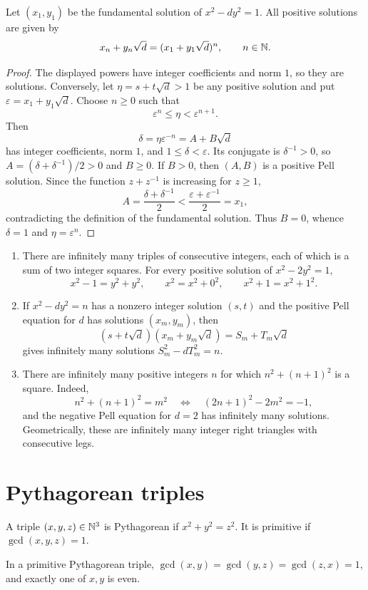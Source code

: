 \begin{thm}
Let $(x_1,y_1)$ be the fundamental solution of $x^2-dy^2=1$.  All positive solutions are given by
\[
 x_n+y_n\sqrt d=(x_1+y_1\sqrt d)^n,
 \qquad n\in\mathbb{N}.
\]
\end{thm}
\begin{proof}
The displayed powers have integer coefficients and norm $1$, so they are solutions.  Conversely, let
$\eta=s+t\sqrt d>1$ be any positive solution and put
$\varepsilon=x_1+y_1\sqrt d$.  Choose $n\ge0$ such that
\[
 \varepsilon^n\le\eta<\varepsilon^{n+1}.
\]
Then
\[
 \delta=\eta\varepsilon^{-n}=A+B\sqrt d
\]
has integer coefficients, norm $1$, and $1\le\delta<\varepsilon$.  Its conjugate is $\delta^{-1}>0$, so
$A=(\delta+\delta^{-1})/2>0$ and $B\ge0$.  If $B>0$, then $(A,B)$ is a positive Pell solution.  Since the function $z+z^{-1}$ is increasing for $z\ge1$,
\[
 A=\frac{\delta+\delta^{-1}}2
 <\frac{\varepsilon+\varepsilon^{-1}}2=x_1,
\]
contradicting the definition of the fundamental solution.  Thus $B=0$, whence $\delta=1$ and $\eta=\varepsilon^n$.
\end{proof}

\begin{app}
\begin{enumerate}[label=(\alph*)]
\item There are infinitely many triples of consecutive integers, each of which is a sum of two integer squares.  For every positive solution of $x^2-2y^2=1$,
\[
 x^2-1=y^2+y^2,
 \qquad
 x^2=x^2+0^2,
 \qquad
 x^2+1=x^2+1^2.
\]
\item If $x^2-dy^2=n$ has a nonzero integer solution $(s,t)$ and the positive Pell equation for $d$ has solutions $(x_m,y_m)$, then
\[
 (s+t\sqrt d)(x_m+y_m\sqrt d)=S_m+T_m\sqrt d
\]
gives infinitely many solutions $S_m^2-dT_m^2=n$.
\item There are infinitely many positive integers $n$ for which $n^2+(n+1)^2$ is a square.  Indeed,
\[
 n^2+(n+1)^2=m^2
 \quad\Longleftrightarrow\quad
 (2n+1)^2-2m^2=-1,
\]
and the negative Pell equation for $d=2$ has infinitely many solutions.  Geometrically, these are infinitely many integer right triangles with consecutive legs.
\end{enumerate}
\end{app}

\section{Pythagorean triples}

\begin{de}
A triple $(x,y,z)\in\mathbb{N}^3$ is Pythagorean if $x^2+y^2=z^2$.  It is primitive if $\gcd(x,y,z)=1$.
\end{de}
\begin{remark}
In a primitive Pythagorean triple, $\gcd(x,y)=\gcd(y,z)=\gcd(z,x)=1$, and exactly one of $x,y$ is even.
\end{remark}

